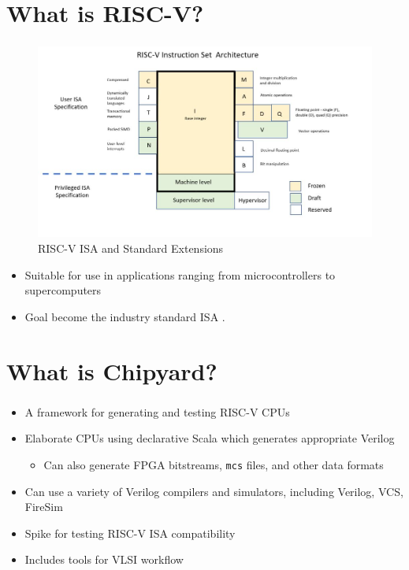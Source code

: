 \documentclass{eceday}
\begin{document}
\section{What is RISC-V?}\label{sec:What_is_RISC-V}
\begin{frame}
  \frametitle{}
  \begin{figure}[h!tbp]
    \centering
    \includegraphics[scale=0.35]{./RISC-V-ISA_and_Extensions.jpg}
    \caption{RISC-V ISA and Standard Extensions \parencite{customRISCVProcessor}}
    \label{fig:RISC-V_ISA-Standard_Extensions}
  \end{figure}
  \vspace{-1.5em}
  \begin{itemize}
  	\item Suitable for use in applications ranging from microcontrollers to supercomputers
  	\item Goal \textrightarrow{} become the industry standard ISA \parencite{FireSimTalk1}.
  \end{itemize}
\end{frame}

\section{What is Chipyard?}\label{sec:What_is_Chipyard}
\begin{frame}
  \frametitle{}
  \begin{itemize}
  \item A framework for generating and testing RISC-V CPUs
  \item Elaborate CPUs using declarative Scala which generates appropriate Verilog
    \begin{itemize}
    \item Can also generate FPGA bitstreams, \texttt{mcs} files, and other data formats
    \end{itemize}
  \item Can use a variety of Verilog compilers and simulators, including Verilog, VCS, FireSim
  \item Spike for testing RISC-V ISA compatibility
  \item Includes tools for VLSI workflow
  \end{itemize}
\end{frame}
\end{document}
